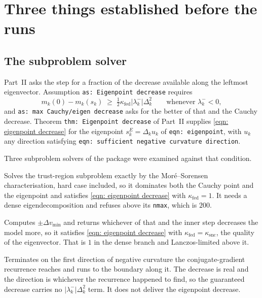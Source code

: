 \documentclass[11pt,a4paper]{article}
\providecommand{\abs}[1]{\left \vert #1 \right \vert}
\providecommand*\mykappa[1]{ \kappa_{\scriptscriptstyle \text{#1}} }
\theoremstyle{remark}
\begin{document}
\section{Three things established before the runs}\label{sec: established}

\subsection{The subproblem solver}\label{sec: subsolver}

Part~II asks the step for a fraction of the decrease available along the leftmost
eigenvector. Assumption \texttt{as: Eigenpoint decrease} requires
\begin{equation}
  m_k(0) - m_k(s_k) \;\geq\; \tfrac12 \mykappa{fed} \abs{\lambda_k^-} \Delta_k^2
  \qquad\text{whenever } \lambda_k^- < 0 ,
  \label{eqn: eigenpoint decrease}
\end{equation}
and \texttt{as: max Cauchy/eigen decrease} asks for the better of that and the
Cauchy decrease. Theorem \texttt{thm: Eigenpoint decrease} of Part~II supplies
\eqref{eqn: eigenpoint decrease} for the eigenpoint $s_k^E = \Delta_k u_k$ of
\texttt{eqn: eigenpoint}, with $u_k$ any direction satisfying
\texttt{eqn: sufficient negative curvature direction}.

Three subproblem solvers of the package were examined against that condition.

\begin{description}[leftmargin=2.2em, style=nextline]
  \item[\texttt{ExactMS}] Solves the trust-region subproblem exactly by the
    Mor\'e--Sorensen characterisation, hard case included, so it dominates both
    the Cauchy point and the eigenpoint and satisfies
    \eqref{eqn: eigenpoint decrease} with $\mykappa{fed} = 1$. It needs a dense
    eigendecomposition and refuses above its \texttt{nmax}, which is $200$.
  \item[\texttt{EigenPoint(SteihaugCG())}] Computes $\pm\Delta v_{\min}$ and
    returns whichever of that and the inner step decreases the model more, so it
    satisfies \eqref{eqn: eigenpoint decrease} with $\mykappa{fed} = \mykappa{snc}$,
    the quality of the eigenvector. That is $1$ in the dense branch and
    Lanczos-limited above it.
  \item[\texttt{SteihaugCG}] Terminates on the first direction of negative
    curvature the conjugate-gradient recurrence reaches and runs to the boundary
    along it. The decrease is real and the direction is whichever the recurrence
    happened to find, so the guaranteed decrease carries no
    $\abs{\lambda_k^-}\Delta_k^2$ term. It does not deliver the eigenpoint
    decrease.
\end{description}
\end{document}

